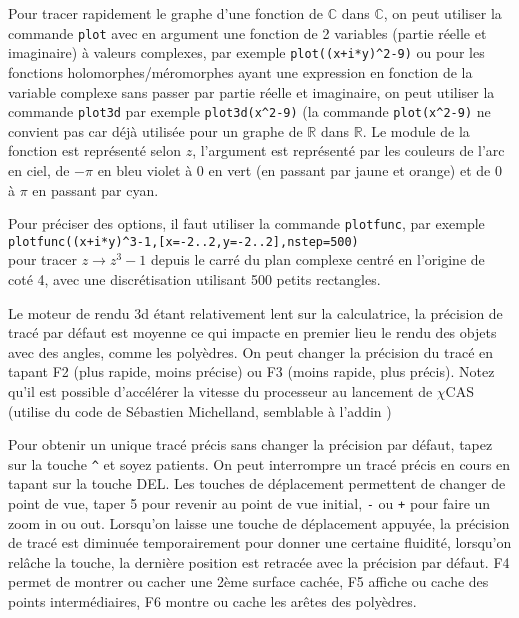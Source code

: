\documentclass{article}
\begin{document}
\begin{giacjshere}
Pour tracer rapidement le graphe d'une fonction de $\mathbb{C}$ dans
$\mathbb{C}$, on peut utiliser la commande \verb|plot| avec
en argument une fonction de 2 variables (partie réelle
et imaginaire) à valeurs complexes,
par exemple \verb|plot((x+i*y)^2-9)| ou pour les fonctions
holomorphes/méromorphes ayant une expression en fonction de la variable
complexe sans passer par partie réelle et imaginaire,
on peut utiliser la commande \verb|plot3d| par exemple
\verb|plot3d(x^2-9)| (la commande \verb|plot(x^2-9)| ne
convient pas car déjà utilisée pour un graphe de $\mathbb{R}$ dans
$\mathbb{R}$. Le module de la fonction est représenté selon $z$,
l'argument est représenté par les couleurs de l'arc en ciel, de $-\pi$
en bleu violet à 0 en vert (en passant par jaune et orange) et de 0 à $\pi$
en passant par cyan.

Pour préciser des options, il faut utiliser la commande \verb|plotfunc|,
par exemple\\
\verb|plotfunc((x+i*y)^3-1,[x=-2..2,y=-2..2],nstep=500)|\\
pour tracer $z \rightarrow z^3-1$ depuis le carré du plan complexe
centré en l'origine
de coté 4, avec une discrétisation utilisant 500 petits rectangles.

Le moteur de rendu 3d \'etant relativement lent sur la calculatrice, la
pr\'ecision de trac\'e par d\'efaut est moyenne ce qui impacte
en premier lieu le rendu des objets avec des angles, comme les poly\`edres. 
On peut changer
la pr\'ecision du trac\'e en tapant F2 (plus rapide, moins pr\'ecise) 
ou F3 (moins rapide, plus pr\'ecis). Notez qu'il est possible
d'accélérer la vitesse du processeur 
au lancement de $\chi$CAS (utilise du code de
S\'ebastien Michelland, semblable \`a l'addin
)

Pour obtenir un unique trac\'e pr\'ecis sans changer la pr\'ecision
par d\'efaut, tapez sur la touche \verb|^| et
soyez patients. On peut interrompre un trac\'e pr\'ecis en cours en tapant
sur la touche DEL.
Les touches de d\'eplacement permettent de changer de point de vue, 
taper 5 pour revenir au point de vue initial,
\verb|-| ou \verb|+| pour faire un zoom in ou out. Lorsqu'on laisse
une touche de d\'eplacement appuy\'ee, la pr\'ecision de trac\'e est
diminu\'ee temporairement pour donner une certaine fluidit\'e,
lorsqu'on rel\^ache la touche, la derni\`ere position est retrac\'ee
avec la pr\'ecision par d\'efaut. 
F4 permet de montrer ou cacher une 2\`eme surface cach\'ee, F5
affiche ou cache des points interm\'ediaires, F6 montre ou cache
les ar\^etes des poly\`edres.


\end{giacjshere}
\end{document}
